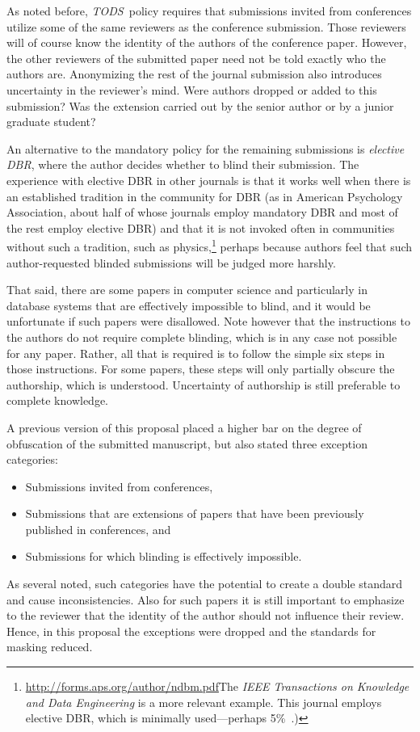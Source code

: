\documentclass[acmtods,acmnow]{acmtrans2m}
\newcommand{\tods}{{\em TODS\/}}
\begin{document}
As noted before, \tods\ policy requires that submissions
invited from conferences utilize some of the same reviewers as the
conference submission. Those reviewers will of course know the identity of
the authors of
the conference paper. However, the other reviewers of the submitted paper
need not be told exactly who the authors are. Anonymizing the rest of the
journal submission also introduces uncertainty in the reviewer's mind. Were
authors dropped or added to this submission? Was the extension carried out
by the senior author or by a junior graduate student?

An alternative to the mandatory policy for the remaining submissions is {\em
elective DBR}, where the author decides whether to blind their
submission. The experience with elective DBR in other journals is that it
works well when there is an established tradition in the community for DBR
(as in American Psychology Association, about half of whose journals employ
mandatory DBR and most of the rest employ elective DBR) and that it is not
invoked often in communities without such a tradition, such as
physics,\footnote{\url{http://forms.aps.org/author/ndbm.pdf}\quad The {\em
IEEE Transactions on Knowledge and Data Engineering} is a more relevant
example. This journal employs elective DBR, which is minimally
used---perhaps 5\%~\cite{werner06}.)} perhaps because authors feel that such
author-requested blinded submissions will be judged more harshly.

That said, there are some papers in computer science and particularly in
database systems that are effectively impossible to blind, and it would be
unfortunate if such papers were disallowed. Note however that the
instructions to the authors do not require complete blinding, which is in
any case not possible for any paper. Rather, all that is required is to
follow the simple six steps in those instructions. For some papers, these steps
will only partially obscure the authorship, which is understood. Uncertainty
of authorship is still preferable to complete knowledge.

\pagebreak
A previous version of this proposal placed a higher bar on the degree of
obfuscation of the submitted manuscript, but also stated three exception
categories:
\begin{itemize}
\item Submissions invited from conferences,
\item Submissions that are extensions of papers that have
been previously published in conferences, and
\item Submissions for which blinding is effectively impossible.
\end{itemize}
As several noted, such categories have the potential to create a
double standard and cause inconsistencies. Also for such papers it is still
important to emphasize to the reviewer that the identity of the author
should not influence their review. Hence, in this proposal the
exceptions were dropped and the standards for masking reduced.
\end{document}
